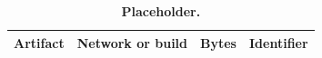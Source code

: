 \begin{table}[tbp]
\centering
\caption{\textbf{Placeholder.} }\label{tab:tab-artifacts}
\footnotesize\begin{tabularx}{\linewidth}{@{}LLLL@{}}
\toprule
\textbf{Artifact} & \textbf{Network or build} & \textbf{Bytes} & \textbf{Identifier} \\
\midrule

\bottomrule
\end{tabularx}
\end{table}

